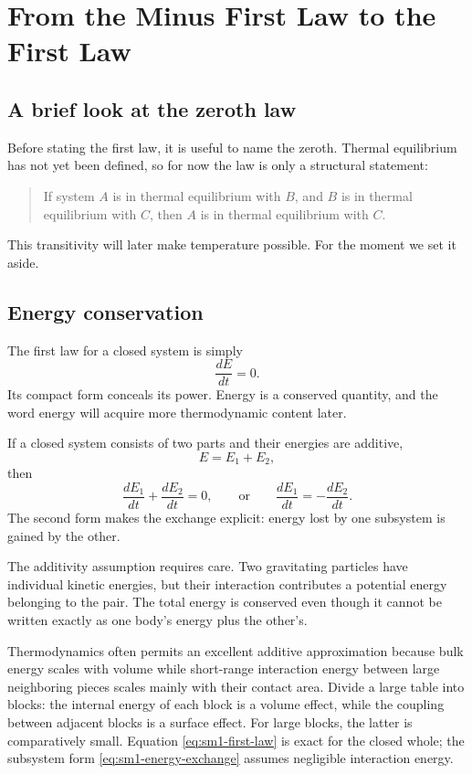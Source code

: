\section{From the Minus First Law to the First Law}

\subsection{A brief look at the zeroth law}

Before stating the first law, it is useful to name the zeroth. Thermal
equilibrium has not yet been defined, so for now the law is only a structural
statement:
\begin{quote}
If system \(A\) is in thermal equilibrium with \(B\), and \(B\) is in thermal
equilibrium with \(C\), then \(A\) is in thermal equilibrium with \(C\).
\end{quote}
This transitivity will later make temperature possible. For the moment we set
it aside.

\subsection{Energy conservation}

The first law for a closed system is simply
\begin{equation}
 \frac{dE}{dt}=0.
 \label{eq:sm1-first-law}
\end{equation}
Its compact form conceals its power. Energy is a conserved quantity, and the
word energy will acquire more thermodynamic content later.

If a closed system consists of two parts and their energies are additive,
\begin{equation}
 E=E_1+E_2,
\end{equation}
then
\begin{equation}
 \frac{dE_1}{dt}+\frac{dE_2}{dt}=0,
 \qquad\text{or}\qquad
 \frac{dE_1}{dt}=-\frac{dE_2}{dt}.
 \label{eq:sm1-energy-exchange}
\end{equation}
The second form makes the exchange explicit: energy lost by one subsystem is
gained by the other.

The additivity assumption requires care. Two gravitating particles have
individual kinetic energies, but their interaction contributes a potential
energy belonging to the pair. The total energy is conserved even though it
cannot be written exactly as one body's energy plus the other's.

Thermodynamics often permits an excellent additive approximation because
bulk energy scales with volume while short-range interaction energy between
large neighboring pieces scales mainly with their contact area. Divide a
large table into blocks: the internal energy of each block is a volume
effect, while the coupling between adjacent blocks is a surface effect. For
large blocks, the latter is comparatively small. Equation
\eqref{eq:sm1-first-law} is exact for the closed whole; the subsystem form
\eqref{eq:sm1-energy-exchange} assumes negligible interaction energy.

